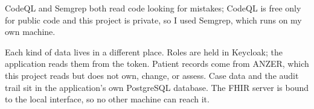 CodeQL and Semgrep both read code looking for mistakes; CodeQL is free only for public code and this project is private, so I used Semgrep, which runs on my own machine.

Each kind of data lives in a different place. Roles are held in Keycloak; the application reads them from the token. Patient records come from ANZER, which this project reads but does not own, change, or assess. Case data and the audit trail sit in the application's own PostgreSQL database. The FHIR server is bound to the local interface, so no other machine can reach it.
